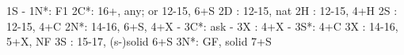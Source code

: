 1S - 1N*: F1
2C*: 16+, any; or 12-15, 6+S
2D : 12-15, nat
2H : 12-15, 4+H
2S : 12-15, 4+C
2N*: 14-16, 6+S, 4+X
   - 3C*: ask
        - 3X : 4+X
        - 3S*: 4+C
3X : 14-16, 5+X, NF
3S : 15-17, (s-)solid 6+S
3N*: GF, solid 7+S